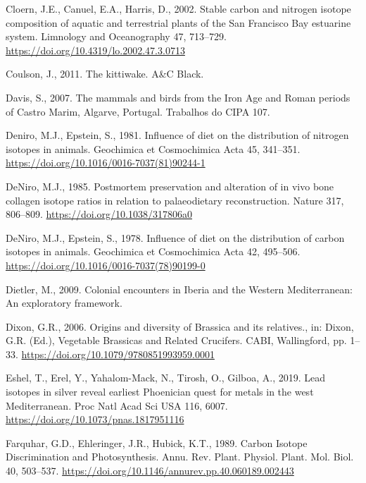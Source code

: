 \documentclass[3p]{elsarticle} %
\newlength{\cslhangindent}
\newlength{\cslentryspacingunit} %
\newenvironment{CSLReferences}[2] %
 {%
  \setlength{\parindent}{0pt}
  \ifodd #1
  \let\oldpar\par
  \def\par{\hangindent=\cslhangindent\oldpar}
  \fi
  \setlength{\parskip}{#2\cslentryspacingunit}
 }%
 {}
\begin{document}
\begin{CSLReferences}{1}{0}
\leavevmode{}%
Cloern, J.E., Canuel, E.A., Harris, D., 2002. Stable carbon and nitrogen isotope composition of aquatic and terrestrial plants of the {San Francisco Bay} estuarine system. Limnology and Oceanography 47, 713--729. \url{https://doi.org/10.4319/lo.2002.47.3.0713}

\leavevmode{}%
Coulson, J., 2011. The kittiwake. {A\&C Black}.

\leavevmode{}%
Davis, S., 2007. The mammals and birds from the {Iron Age} and {Roman} periods of {Castro Marim}, {Algarve}, {Portugal}. Trabalhos do CIPA 107.

\leavevmode{}%
Deniro, M.J., Epstein, S., 1981. Influence of diet on the distribution of nitrogen isotopes in animals. Geochimica et Cosmochimica Acta 45, 341--351. \url{https://doi.org/10.1016/0016-7037(81)90244-1}

\leavevmode{}%
DeNiro, M.J., 1985. Postmortem preservation and alteration of in vivo bone collagen isotope ratios in relation to palaeodietary reconstruction. Nature 317, 806--809. \url{https://doi.org/10.1038/317806a0}

\leavevmode{}%
DeNiro, M.J., Epstein, S., 1978. Influence of diet on the distribution of carbon isotopes in animals. Geochimica et Cosmochimica Acta 42, 495--506. \url{https://doi.org/10.1016/0016-7037(78)90199-0}

\leavevmode{}%
Dietler, M., 2009. Colonial encounters in {Iberia} and the {Western Mediterranean}: {An} exploratory framework.

\leavevmode{}%
Dixon, G.R., 2006. Origins and diversity of {Brassica} and its relatives., in: Dixon, G.R. (Ed.), Vegetable Brassicas and Related Crucifers. {CABI}, {Wallingford}, pp. 1--33. \url{https://doi.org/10.1079/9780851993959.0001}

\leavevmode{}%
Eshel, T., Erel, Y., Yahalom-Mack, N., Tirosh, O., Gilboa, A., 2019. Lead isotopes in silver reveal earliest {Phoenician} quest for metals in the west {Mediterranean}. Proc Natl Acad Sci USA 116, 6007. \url{https://doi.org/10.1073/pnas.1817951116}

\leavevmode{}%
Farquhar, G.D., Ehleringer, J.R., Hubick, K.T., 1989. Carbon {Isotope Discrimination} and {Photosynthesis}. Annu. Rev. Plant. Physiol. Plant. Mol. Biol. 40, 503--537. \url{https://doi.org/10.1146/annurev.pp.40.060189.002443}


\end{CSLReferences}
\end{document}
